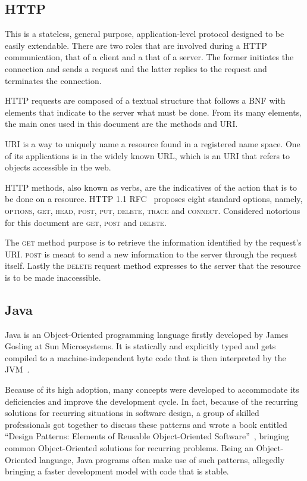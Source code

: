 \subsection{HTTP}
This is a stateless, general purpose, application-level protocol designed to be easily extendable. There are two roles that are involved during a \gls{HTTP} communication, that of a client and a that of a server. The former initiates the connection and sends a request and the latter replies to the request and terminates the connection.

\gls{HTTP} requests are composed of a textual structure that follows a \gls{BNF} with elements that indicate to the server what must be done. From its many elements, the main ones used in this document are the methods and \gls{URI}.

\gls{URI} is a way to uniquely name a resource found in a registered name space. One of its applications is in the widely known \gls{URL}, which is an \gls{URI} that refers to objects accessible in the web.

\gls{HTTP} methods, also known as verbs, are the indicatives of the action that is to be done on a resource. \gls{HTTP} 1.1 \gls{RFC}~\cite{http} proposes eight standard options, namely, \textsc{options}, \textsc{get}, \textsc{head}, \textsc{post}, \textsc{put}, \textsc{delete}, \textsc{trace} and \textsc{connect}. Considered notorious for this document are \textsc{get}, \textsc{post} and \textsc{delete}.

The \textsc{get} method purpose is to retrieve the information identified by the request's \gls{URI}. \textsc{post} is meant to send a new information to the server through the request itself. Lastly the \textsc{delete} request method expresses to the server that the resource is to be made inaccessible.

\subsection{Java}
Java is an Object-Oriented programming language firstly developed by James Gosling at Sun Microsystems. It is statically and explicitly typed and gets compiled to a machine-independent byte code that is then interpreted by the \gls{JVM}~\cite{java}.

Because of its high adoption, many concepts were developed to accommodate its deficiencies and improve the development cycle. In fact, because of the recurring solutions for recurring situations in software design, a group of skilled professionals got together to discuss these patterns and wrote a book entitled ``Design Patterns: Elements of Reusable Object-Oriented Software''~\cite{patterns}, bringing common Object-Oriented solutions for recurring problems. Being an Object-Oriented language, Java programs often make use of such patterns, allegedly bringing a faster development model with code that is stable.

